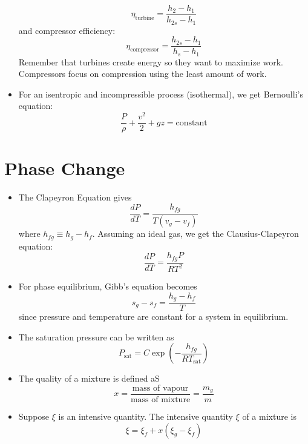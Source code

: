 \documentclass{article}
\begin{document}
\begin{itemize}
    \begin{equation}
        \eta_\text{turbine} = \frac{h_2-h_1}{h_{2s}-h_1}
    \end{equation}
    and compressor efficiency:
    \begin{equation}
        \eta_\text{compressor} = \frac{h_{2s}-h_1}{h_{s}-h_1}
    \end{equation}
    Remember that turbines create energy so they want to maximize work. Compressors focus on compression using the least amount of work.
    \item For an isentropic and incompressible process (isothermal), we get Bernoulli's equation: 
    \begin{equation}
        \frac{P}{\rho}+\frac{v^2}{2}+gz = \text{constant}
    \end{equation}
\end{itemize}
\section{Phase Change}
\begin{itemize}
    \item The Clapeyron Equation gives 
    \begin{equation}
        \frac{dP}{dT} = \frac{h_{fg}}{T(v_g-v_f)}
    \end{equation}
    where $h_{fg} \equiv h_g-h_f$. Assuming an ideal gas, we get the Clausius-Clapeyron equation: 
    \begin{equation}
        \frac{dP}{dT} = \frac{h_{fg}P}{RT^2}
    \end{equation}
    \item For phase equilibrium, Gibb's equation becomes 
    \begin{equation}
        s_g-s_f=\frac{h_g-h_f}{T}
    \end{equation}
    since pressure and temperature are constant for a system in equilibrium.
    \item The saturation pressure can be written as 
    \begin{equation}
        P_\text{sat} = C\exp\left(-\frac{h_{fg}}{RT_\text{sat}}\right)
    \end{equation}
    \item The quality of a mixture is defined aS 
    \begin{equation}
        x = \frac{\text{mass of vapour}}{\text{mass of mixture}} = \frac{m_g}{m}
    \end{equation}
    \item Suppose $\xi$ is an intensive quantity. The intensive quantity $\xi$ of a mixture is 
    \begin{equation}
        \xi = \xi_f + x(\xi_g-\xi_f) 
    \end{equation}
\end{itemize}
\end{document}
